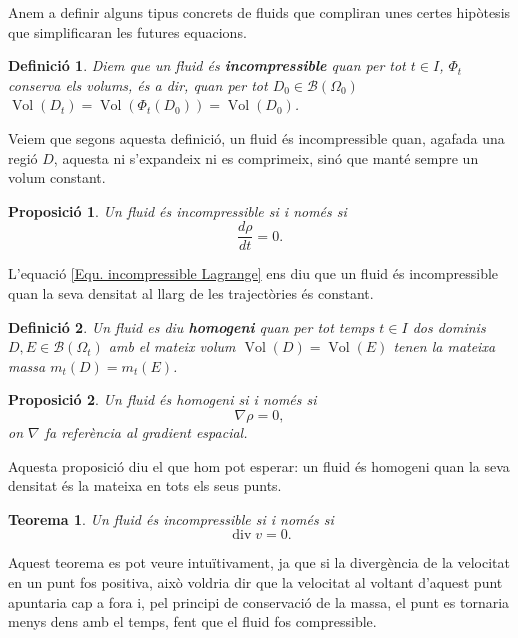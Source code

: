 \documentclass{article}
\numberwithin{equation}{section}
\DeclareMathOperator{\Vol}{Vol}
\DeclareMathOperator{\diver}{div}
\newtheorem{teorema}{Teorema}[section]
\newtheorem{definicio}{Definici\'{o}}[section]
\newtheorem{proposicio}{Proposici\'{o}}[section]
\begin{document}
Anem a definir alguns tipus concrets de fluids que compliran unes certes hip\`{o}tesis que simplificaran les futures equacions.

\begin{definicio}
Diem que un fluid \'{e}s \textbf{incompressible} quan per tot $t\in I$, $\Phi_t$ conserva els volums, \'{e}s a dir, quan per tot $D_0\in\mathcal{B}(\Omega_0)$ $\Vol(D_t)=\Vol(\Phi_t(D_0))=\Vol(D_0)$.
\end{definicio}

Veiem que segons aquesta definici\'{o}, un fluid \'{e}s incompressible quan, agafada una regi\'{o} $D$, aquesta ni s'expandeix ni es comprimeix, sin\'{o} que mant\'{e} sempre un volum constant.

\begin{proposicio}
Un fluid \'{e}s incompressible si i nom\'{e}s si
\begin{equation}\label{Equ. incompressible Lagrange}
\frac{d\rho}{dt}=0.
\end{equation}
\end{proposicio}

L'equaci\'{o} \ref{Equ. incompressible Lagrange} ens diu que un fluid \'{e}s incompressible quan la seva densitat al llarg de les traject\`{o}ries \'{e}s constant.

\begin{definicio}
Un fluid es diu \textbf{homogeni} quan per tot temps $t\in I$ dos dominis $D,E\in\mathcal{B}(\Omega_t)$ amb el mateix volum $\Vol(D)=\Vol(E)$ tenen la mateixa massa $m_t(D)=m_t(E)$.
\end{definicio}

\begin{proposicio}
Un fluid \'{e}s homogeni si i nom\'{e}s si
\begin{equation}
\nabla\rho=0,
\end{equation}
on $\nabla$ fa refer\`{e}ncia al gradient espacial.
\end{proposicio}

Aquesta proposici\'{o} diu el que hom pot esperar: un fluid \'{e}s homogeni quan la seva densitat \'{e}s la mateixa en tots els seus punts.

\begin{teorema}
Un fluid \'{e}s incompressible si i nom\'{e}s si
\begin{equation}
\diver v=0.
\end{equation}
\end{teorema}

Aquest teorema es pot veure intu\"{i}tivament, ja que si la diverg\`{e}ncia de la velocitat en un punt fos positiva, aix\`{o} voldria dir que la velocitat al voltant d'aquest punt apuntaria cap a fora i, pel principi de conservaci\'{o} de la massa, el punt es tornaria menys dens amb el temps, fent que el fluid fos compressible.
\end{document}
